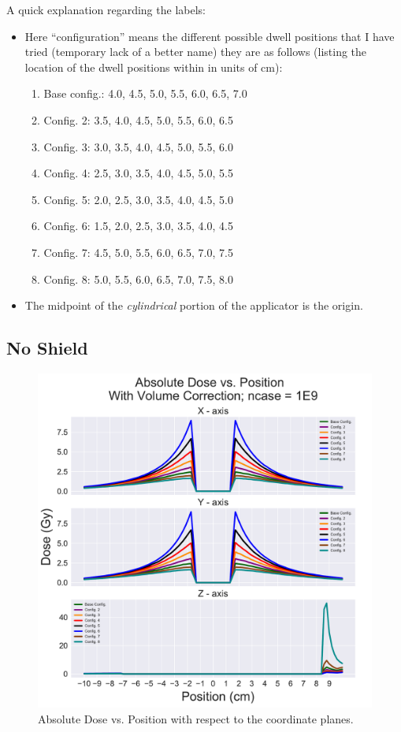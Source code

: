 \documentclass[12pt]{article}
\begin{document}
A quick explanation regarding the labels:
\begin{itemize}
	\item Here ``configuration'' means the different possible dwell positions that I have tried (temporary lack of a better name) they are as follows (listing the location of the dwell positions within in units of cm):
	\begin{enumerate}
		\item Base config.: 4.0, 4.5, 5.0, 5.5, 6.0, 6.5, 7.0
		\item Config. 2: 3.5, 4.0, 4.5, 5.0, 5.5, 6.0, 6.5
		\item Config. 3: 3.0, 3.5, 4.0, 4.5, 5.0, 5.5, 6.0
		\item Config. 4: 2.5, 3.0, 3.5, 4.0, 4.5, 5.0, 5.5
		\item Config. 5: 2.0, 2.5, 3.0, 3.5, 4.0, 4.5, 5.0
		\item Config. 6: 1.5, 2.0, 2.5, 3.0, 3.5, 4.0, 4.5
		\item Config. 7: 4.5, 5.0, 5.5, 6.0, 6.5, 7.0, 7.5
		\item Config. 8: 5.0, 5.5, 6.0, 6.5, 7.0, 7.5, 8.0
	\end{enumerate}
	\item The midpoint of the \emph{cylindrical} portion of the applicator is the origin.
\end{itemize}

\subsection{No Shield}

\begin{figure}[!ht]
	\centering
	\includegraphics[scale=0.6]{dosage_comparison_noShield}
	\caption{Absolute Dose vs. Position with respect to the coordinate planes.}
\end{figure}
\end{document}
